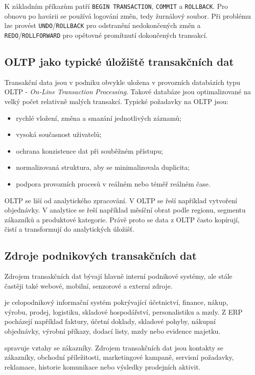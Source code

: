 K základním příkazům patří \texttt{BEGIN TRANSACTION}, \texttt{COMMIT} a \texttt{ROLLBACK}. Pro
obnovu po havárii se používá logování změn, tedy žurnálový soubor. Při problému lze provést
\texttt{UNDO}/\texttt{ROLLBACK} pro odstranění nedokončených změn a \texttt{REDO}/\texttt{ROLLFORWARD}
pro opětovné promítnutí dokončených transakcí.

\subsection{OLTP jako typické úložiště transakčních dat}
Transakční data jsou v podniku obvykle uložena v provozních databázích typu OLTP -
\textit{On-Line Transaction Processing}. Takové databáze jsou optimalizované na velký počet
relativně malých transakcí. Typické požadavky na OLTP jsou:
\begin{itemize}
  \item rychlé vložení, změna a smazání jednotlivých záznamů;
  \item vysoká současnost uživatelů;
  \item ochrana konzistence dat při souběžném přístupu;
  \item normalizovaná struktura, aby se minimalizovala duplicita;
  \item podpora provozních procesů v reálném nebo téměř reálném čase.
\end{itemize}

OLTP se liší od analytického zpracování. V OLTP se řeší například vytvoření objednávky. V analytice
se řeší například měsíční obrat podle regionu, segmentu zákazníků a produktové kategorie. Právě
proto se data z OLTP často kopírují, čistí a transformují do analytických úložišť.

\subsection{Zdroje podnikových transakčních dat}
Zdrojem transakčních dat bývají hlavně interní podnikové systémy, ale stále častěji také webové,
mobilní, senzorové a externí zdroje.

 je celopodnikový informační systém pokrývající účetnictví, finance, nákup, výrobu,
prodej, logistiku, skladové hospodářství, personalistiku a mzdy. Z ERP pocházejí například faktury,
účetní doklady, skladové pohyby, nákupní objednávky, výrobní příkazy, dodací listy, mzdy nebo
evidence majetku.

 spravuje vztahy se zákazníky. Zdrojem transakčních dat jsou kontakty se zákazníky,
obchodní příležitosti, marketingové kampaně, servisní požadavky, reklamace, historie komunikace
nebo výsledky prodejních aktivit.

